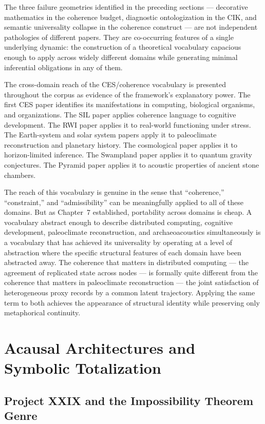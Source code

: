\documentclass[12pt, openright, twoside]{book}
\begin{document}
The three failure geometries identified in the preceding sections --- decorative
mathematics in the coherence budget, diagnostic ontologization in the CIK,
and semantic universality collapse in the coherence construct --- are not
independent pathologies of different papers. They are co-occurring features
of a single underlying dynamic: the construction of a theoretical vocabulary
capacious enough to apply across widely different domains while generating
minimal inferential obligations in any of them.

The cross-domain reach of the CES/coherence vocabulary is presented throughout
the corpus as evidence of the framework's explanatory power. The first CES paper
identifies its manifestations in computing, biological organisms, and organizations.
The SIL paper applies coherence language to cognitive development. The RWI paper
applies it to real-world functioning under stress. The Earth-system and solar
system papers apply it to paleoclimate reconstruction and planetary history.
The cosmological paper applies it to horizon-limited inference. The Swampland
paper applies it to quantum gravity conjectures. The Pyramid paper applies it
to acoustic properties of ancient stone chambers.

The reach of this vocabulary is genuine in the sense that ``coherence,''
``constraint,'' and ``admissibility'' can be meaningfully applied to all of
these domains. But as Chapter~7 established, portability across domains is
cheap. A vocabulary abstract enough to describe distributed computing, cognitive
development, paleoclimate reconstruction, and archaeoacoustics simultaneously
is a vocabulary that has achieved its universality by operating at a level
of abstraction where the specific structural features of each domain have
been abstracted away. The coherence that matters in distributed computing
--- the agreement of replicated state across nodes --- is formally quite
different from the coherence that matters in paleoclimate reconstruction ---
the joint satisfaction of heterogeneous proxy records by a common latent
trajectory. Applying the same term to both achieves the appearance of
structural identity while preserving only metaphorical continuity.


\chapter{Acausal Architectures and Symbolic Totalization}

\section{Project XXIX and the Impossibility Theorem Genre}
\end{document}
